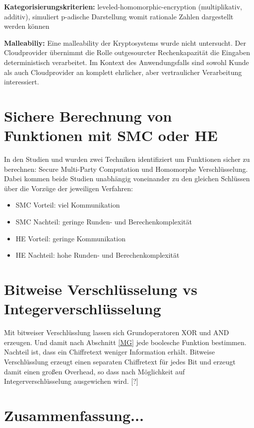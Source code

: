 \textbf{Kategorisierungskriterien:} leveled-homomorphic-encryption (multiplikativ, additiv), simuliert p-adische Darstellung womit rationale Zahlen dargestellt werden können

\textbf{Malleabiliy:} Eine malleability der Kryptosystems wurde nicht untersucht. Der Cloudprovider übernimmt die Rolle outgesourcter Rechenkapazität die Eingaben deterministisch verarbeitet. Im Kontext des Anwendungsfalls sind sowohl Kunde als auch Cloudprovider an komplett ehrlicher, aber vertraulicher Verarbeitung interessiert. 

\section{Sichere Berechnung von Funktionen mit SMC oder HE}
In den Studien \cite[p.420]{damgaard2007efficient} und \cite[p.2]{sadeghi2009efficient} wurden zwei Techniken identifiziert um Funktionen sicher zu berechnen: Secure Multi-Party Computation und Homomorphe Verschlüsselung. Dabei kommen beide Studien unabhängig voneinander zu den gleichen Schlüssen über die Vorzüge der jeweiligen Verfahren:
\begin{itemize}
	\item SMC Vorteil: viel Kommunikation
	\item SMC Nachteil: geringe Runden- und Berechenkomplexität
	\item HE Vorteil: geringe Kommunikation
	\item HE Nachteil: hohe Runden- und Berechenkomplexität
\end{itemize}

\section{Bitweise Verschlüsselung vs Integerverschlüsselung}
Mit bitweiser Verschlüsslung lassen sich Grundoperatoren XOR und AND erzeugen. Und damit nach Abschnitt \ref{MG} jede boolesche Funktion bestimmen. Nachteil ist, dass ein Chiffretext weniger Information erhält. Bitweise Verschlüsslung erzeugt einen separaten Chiffretext für jedes Bit und erzeugt damit einen großen Overhead, so dass nach Möglichkeit auf Integerverschlüsselung ausgewichen wird. [?]



\section{Zusammenfassung...}

